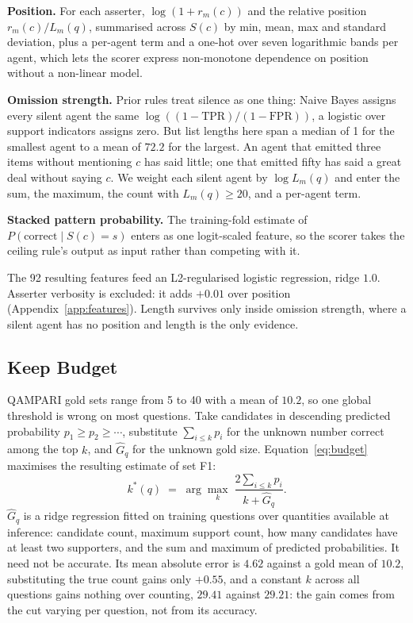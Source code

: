 \documentclass{article}
\begin{document}
\textbf{Position.} For each asserter, $\log(1 + r_m(c))$ and the relative position $r_m(c)/L_m(q)$, summarised across $S(c)$ by min, mean, max and standard deviation, plus a per-agent term and a one-hot over seven logarithmic bands per agent, which lets the scorer express non-monotone dependence on position without a non-linear model.

\textbf{Omission strength.} Prior rules treat silence as one thing: Naive Bayes assigns every silent agent the same $\log((1-\mathrm{TPR})/(1-\mathrm{FPR}))$, a logistic over support indicators assigns zero. But list lengths here span a median of 1 for the smallest agent to a mean of $72.2$ for the largest.
An agent that emitted three items without mentioning $c$ has said little; one that emitted fifty has said a great deal without saying $c$. We weight each silent agent by $\log L_m(q)$ and enter the sum, the maximum, the count with $L_m(q) \geq 20$, and a per-agent term.

\textbf{Stacked pattern probability.} The training-fold estimate of $P(\mathrm{correct} \mid S(c) = s)$ enters as one logit-scaled feature, so the scorer takes the ceiling rule's output as input rather than competing with it.

The 92 resulting features feed an L2-regularised logistic regression, ridge $1.0$.
Asserter verbosity is excluded: it adds $+0.01$ over position (Appendix~\ref{app:features}). Length survives only inside omission strength, where a silent agent has no position and length is the only evidence.

\subsection{Keep Budget}
\label{sec:slotB}

QAMPARI gold sets range from 5 to 40 with a mean of $10.2$, so one global threshold is wrong on most questions.
Take candidates in descending predicted probability $p_1 \geq p_2 \geq \cdots$, substitute $\sum_{i \leq k} p_i$ for the unknown number correct among the top $k$, and $\hat{G}_q$ for the unknown gold size. Equation~\ref{eq:budget} maximises the resulting estimate of set F1:
\begin{equation}
\label{eq:budget}
  k^*(q) \;=\; \arg\max_k \; \frac{2 \sum_{i \leq k} p_i}{k + \hat{G}_q}.
\end{equation}
$\hat{G}_q$ is a ridge regression fitted on training questions over quantities available at inference: candidate count, maximum support count, how many candidates have at least two supporters, and the sum and maximum of predicted probabilities. It need not be accurate. Its mean absolute error is $4.62$ against a gold mean of $10.2$, substituting the true count gains only $+0.55$, and a constant $k$ across all questions gains nothing over counting, $29.41$ against $29.21$: the gain comes from the cut varying per question, not from its accuracy.
\end{document}
